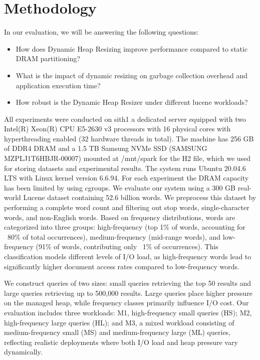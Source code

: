 \section{Methodology}
In our evaluation, we will be answering the following questions:

\begin{itemize}
\item How does Dynamic Heap Resizing improve performance compared to static DRAM partitioning?
\item What is the impact of dynamic resizing on garbage collection overhead and application execution time?
\item How robust is the Dynamic Heap Resizer under different lucene workloads?
\end{itemize}

All experiments were conducted on sith1 a dedicated server equipped with two Intel(R) Xeon(R) CPU E5-2630 v3 processors with 16 physical cores with hyperthreading enabled (32 hardware threads in total). The machine has 256 GB of DDR4 DRAM and a 1.5 TB Samsung NVMe SSD (SAMSUNG MZPLJ1T6HBJR-00007) mounted at /mnt/spark for the H2 file, which we used for storing datasets and experimental results. The system runs Ubuntu 20.04.6 LTS with Linux kernel version 6.6.94. For each experiment the DRAM capacity has been limited by using cgroups.
We evaluate our system using a 300 GB real-world Lucene dataset containing 52.6 billion words. We preprocess this dataset by performing a complete word count and filtering out stop words, single-character words, and non-English words. Based on frequency distributions, words are categorized into three groups: high-frequency (top 1\% of words, accounting for ~80\% of total occurrences), medium-frequency (mid-range words), and low-frequency (91\% of words, contributing only ~1\% of occurrences). This classification models different levels of I/O load, as high-frequency words lead to significantly higher document access rates compared to low-frequency words.

We construct queries of two sizes: small queries retrieving the top 50 results and large queries retrieving up to 500,000 results. Large queries place higher pressure on the managed heap, while frequency classes primarily influence I/O cost. Our evaluation includes three workloads:
M1, high-frequency small queries (HS);
M2, high-frequency large queries (HL); and
M3, a mixed workload consisting of medium-frequency small (MS) and medium-frequency large (ML) queries, reflecting realistic deployments where both I/O load and heap pressure vary dynamically.

